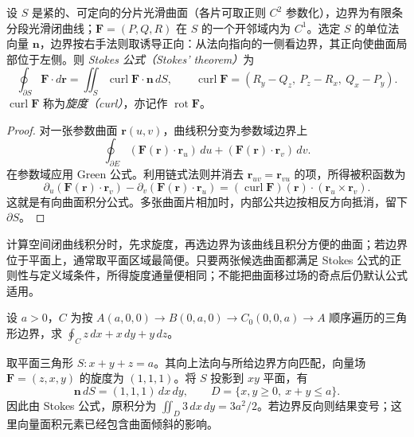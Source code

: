 \begin{theorem}
\label{thm:pei-stokes}
设 $S$ 是紧的、可定向的分片光滑曲面（各片可取正则 $C^2$ 参数化），边界为有限条分段光滑闭曲线；$\boldsymbol F=(P,Q,R)$ 在 $S$ 的一个开邻域内为 $C^1$。选定 $S$ 的单位法向量 $\boldsymbol n$，边界按右手法则取诱导正向：从法向指向的一侧看边界，其正向使曲面局部位于左侧。则 \emph{Stokes 公式（Stokes' theorem）}为
\begin{equation}
\label{eq:pei-stokes}
\oint_{\partial S}\boldsymbol F\cdot d\boldsymbol r
=\iint_S\operatorname{curl}\boldsymbol F\cdot\boldsymbol n\,dS,
\qquad
\operatorname{curl}\boldsymbol F=(R_y-Q_z,\ P_z-R_x,\ Q_x-P_y).
\end{equation}
$\operatorname{curl}\boldsymbol F$ 称为\emph{旋度（curl）}，亦记作 $\operatorname{rot}\boldsymbol F$。
\end{theorem}
\begin{proof}
对一张参数曲面 $\boldsymbol r(u,v)$，曲线积分变为参数域边界上
\[
\oint_{\partial E}(\boldsymbol F(\boldsymbol r)\cdot\boldsymbol r_u)\,du
+(\boldsymbol F(\boldsymbol r)\cdot\boldsymbol r_v)\,dv.
\]
在参数域应用 Green 公式。利用链式法则并消去 $\boldsymbol r_{uv}=\boldsymbol r_{vu}$ 的项，所得被积函数为
\[
\partial_u(\boldsymbol F(\boldsymbol r)\cdot\boldsymbol r_v)
-\partial_v(\boldsymbol F(\boldsymbol r)\cdot\boldsymbol r_u)
=(\operatorname{curl}\boldsymbol F)(\boldsymbol r)\cdot
(\boldsymbol r_u\times\boldsymbol r_v).
\]
这就是有向曲面积分公式。多张曲面片相加时，内部公共边按相反方向抵消，留下 $\partial S$。
\end{proof}

计算空间闭曲线积分时，先求旋度，再选边界为该曲线且积分方便的曲面；若边界位于平面上，通常取平面区域最简便。只要两张候选曲面都满足 Stokes 公式的正则性与定义域条件，所得旋度通量便相同；不能把曲面移过场的奇点后仍默认公式适用。

\begin{example}
\label{ex:pei-stokes-triangle}
设 $a>0$，$C$ 为按 $A(a,0,0)\to B(0,a,0)\to C_0(0,0,a)\to A$ 顺序遍历的三角形边界，求 $\oint_C z\,dx+x\,dy+y\,dz$。
\end{example}
\begin{solve}
取平面三角形 $S:x+y+z=a$。其向上法向与所给边界方向匹配，向量场 $\boldsymbol F=(z,x,y)$ 的旋度为 $(1,1,1)$。将 $S$ 投影到 $xy$ 平面，有
\[
\boldsymbol n\,dS=(1,1,1)\,dx\,dy,
\qquad D=\{x,y\ge0,\ x+y\le a\}.
\]
因此由 Stokes 公式，原积分为 $\iint_D3\,dx\,dy=3a^2/2$。若边界反向则结果变号；这里向量面积元素已经包含曲面倾斜的影响。
\end{solve}

